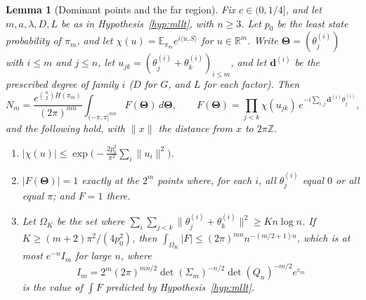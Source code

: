 \documentclass[11pt]{article}
\newtheorem{lemma}[theorem]{Lemma}
\newcommand{\EE}{\mathbb{E}}
\begin{document}
\begin{lemma}[Dominant points and the far region]
\label{lem:mllt-far}
Fix \(c\in(0,1/4]\), and let \(m,a,\lambda,D,L\) be as in
Hypothesis~\ref{hyp:mllt}, with \(n\ge3\).
Let \(p_0\) be the least state probability of \(\pi_m\), and let
\(\chi(u)=\EE_{\pi_m}e^{i\langle u,S\rangle}\) for \(u\in\mathbb R^m\).
Write \(\boldsymbol\Theta=(\theta^{(i)}_j)\) with \(i\le m\) and \(j\le n\), let
\(u_{jk}=(\theta^{(i)}_j+\theta^{(i)}_k)_{i\le m}\), and let
\(\boldsymbol d^{(i)}\) be the prescribed degree of family \(i\)
(\(D\) for \(G\), and \(L\) for each factor). Then
\[
N_m=\frac{e^{\binom n2H(\pi_m)}}{(2\pi)^{mn}}\int_{(-\pi,\pi]^{mn}}F(\boldsymbol\Theta)\,d\boldsymbol\Theta,
\qquad
F(\boldsymbol\Theta)=\prod_{j<k}\chi(u_{jk})\,
e^{-i\sum_{i,j}\boldsymbol d^{(i)}\theta^{(i)}_j},
\]
and the following hold, with \(\|x\|\) the distance from \(x\) to
\(2\pi\mathbb Z\).
\begin{enumerate}
\item[(a)] \(|\chi(u)|\le\exp\bigl(-\frac{2p_0^2}{\pi^2}\sum_i\|u_i\|^2\bigr)\).
\item[(b)] \(|F(\boldsymbol\Theta)|=1\) exactly at the \(2^m\) points where, for
each \(i\), all \(\theta^{(i)}_j\) equal \(0\) or all equal \(\pi\); and \(F=1\) there.
\item[(c)] Let \(\Omega_K\) be the set where
\(\sum_i\sum_{j<k}\|\theta^{(i)}_j+\theta^{(i)}_k\|^2\ge Kn\log n\). If
\(K\ge(m+2)\pi^2/(4p_0^2)\), then
\(\int_{\Omega_K}|F|\le(2\pi)^{mn}n^{-(m/2+1)n}\), which is at most
\(e^{-n}I_m\) for large \(n\), where
\[
I_m=2^m(2\pi)^{mn/2}\det(\Sigma_m)^{-n/2}\det(Q_n)^{-m/2}e^{c_m}
\]
is the value of \(\int F\) predicted by Hypothesis~\ref{hyp:mllt}.
\end{enumerate}
\end{lemma}
\end{document}

